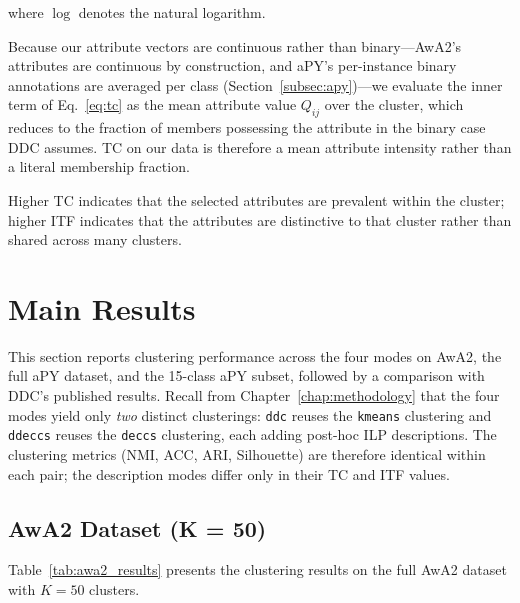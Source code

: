 where $\log$ denotes the natural logarithm.

Because our attribute vectors are continuous rather than binary---AwA2's attributes are continuous by construction, and aPY's per-instance binary annotations are averaged per class (Section~\ref{subsec:apy})---we evaluate the inner term of Eq.~\ref{eq:tc} as the mean attribute value $Q_{ij}$ over the cluster, which reduces to the fraction of members possessing the attribute in the binary case DDC assumes. TC on our data is therefore a mean attribute intensity rather than a literal membership fraction.

Higher TC indicates that the selected attributes are prevalent within the cluster; higher ITF indicates that the attributes are distinctive to that cluster rather than shared across many clusters.

\section{Main Results}
\label{sec:results}

This section reports clustering performance across the four modes on AwA2, the full aPY dataset, and the 15-class aPY subset, followed by a comparison with DDC's published results. Recall from Chapter~\ref{chap:methodology} that the four modes yield only \emph{two} distinct clusterings: \texttt{ddc} reuses the \texttt{kmeans} clustering and \texttt{ddeccs} reuses the \texttt{deccs} clustering, each adding post-hoc ILP descriptions. The clustering metrics (NMI, ACC, ARI, Silhouette) are therefore identical within each pair; the description modes differ only in their TC and ITF values.

\subsection{AwA2 Dataset (K = 50)}

Table~\ref{tab:awa2_results} presents the clustering results on the full AwA2 dataset with $K = 50$ clusters.

